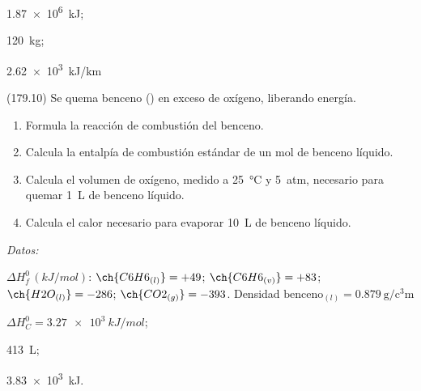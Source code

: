 \documentclass[10pt,a5paper,twoside]{article}
\newenvironment{gexdatos}{
      \vspace{4pt}
      \noindent\small\textit{Datos:}
    }{\vspace{5pt}}
\begin{document}
  \begin{solution}
    \begin{enumerate*}
      \item \SI{1.87e6}{kJ}; \item \SI{120}{\kilo\gram}; \item \SI{2.62e3}{kJ/km}
    \end{enumerate*}
  \end{solution}




  \begin{exercise}[
      tags    = {},
      topics  = {química, termodinámica, termoquímica},
      source  = {FQ 1B MGH 2016, p179, e10},
    ]
    (179.10) Se quema benceno () en exceso de oxígeno, liberando energía.

    \begin{enumerate}
      \item Formula la reacción de combustión del benceno.
      \item Calcula la entalpía de combustión estándar de un mol de
      benceno líquido.
      \item Calcula el volumen de oxígeno, medido a \SI{25}{\celsius} y \SI{5}{atm}, necesario para quemar \SI{1}{\liter} de benceno líquido.
      \item Calcula el calor necesario para evaporar \SI{10}{\liter} de benceno líquido.
    \end{enumerate}

    \begin{gexdatos}
      \( \Delta H^0_f\,(\si{kJ/mol}) \):
      \( \ch{C6H6_{(l)}}  = +49 \);
      \( \ch{C6H6_{(v)}}  = +83 \);
      \( \ch{H2O_{(l)}}   = -286 \);
      \( \ch{CO2_{(g)}}   = -393 \).
      Densidad \( \textrm{benceno}_{(l)} = \SI{0.879}{\gram\per\cubic\centi\meter} \)
    \end{gexdatos}
  \end{exercise}

  \begin{solution}
    \begin{enumerate*}
      \item \( \Delta H^0_C = \SI{3.27e3}{kJ/mol} \); \item \SI{413}{\liter}; \item \SI{3.83e3}{kJ}.
    \end{enumerate*}
  \end{solution}
\end{document}
